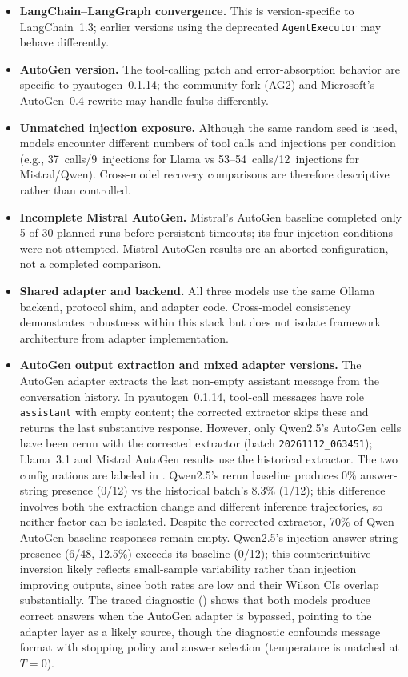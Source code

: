 \documentclass[make,article,submit,moreauthors,pdftex]{mdpi}
\begin{document}
\begin{itemize}
  \item {\textbf{LangChain--LangGraph convergence.} This is version-specific to LangChain~1.3; earlier versions using the deprecated \texttt{AgentExecutor} may behave differently.}
  \item {\textbf{AutoGen version.} The tool-calling patch and error-absorption behavior are specific to pyautogen~0.1.14; the community fork (AG2) and Microsoft's AutoGen~0.4 rewrite may handle faults differently.}
  \item {\textbf{Unmatched injection exposure.} Although the same random seed is used, models encounter different numbers of tool calls and injections per condition (e.g., 37~calls/9~injections for Llama vs 53--54~calls/12~injections for Mistral/Qwen). Cross-model recovery comparisons are therefore descriptive rather than controlled.}
  \item {\textbf{Incomplete Mistral AutoGen.} Mistral's AutoGen baseline completed only 5 of 30 planned runs before persistent timeouts; its four injection conditions were not attempted. Mistral AutoGen results are an aborted configuration, not a completed comparison.}
  \item {\textbf{Shared adapter and backend.} All three models use the same Ollama backend, protocol shim, and adapter code. Cross-model consistency demonstrates robustness within this stack but does not isolate framework architecture from adapter implementation.}
  \item {\textbf{AutoGen output extraction and mixed adapter versions.} The AutoGen adapter extracts the last non-empty assistant message from the conversation history. In pyautogen~0.1.14, tool-call messages have role \texttt{assistant} with empty content; the corrected extractor skips these and returns the last substantive response. However, only Qwen2.5's AutoGen cells have been rerun with the corrected extractor (batch \texttt{20261112\_063451}); Llama~3.1 and Mistral AutoGen results use the historical extractor. The two configurations are labeled in . Qwen2.5's rerun baseline produces 0\% answer-string presence (0/12) vs the historical batch's 8.3\% (1/12); this difference involves both the extraction change and different inference trajectories, so neither factor can be isolated. Despite the corrected extractor, 70\% of Qwen AutoGen baseline responses remain empty. Qwen2.5's injection answer-string presence (6/48, 12.5\%) exceeds its baseline (0/12); this counterintuitive inversion likely reflects small-sample variability rather than injection improving outputs, since both rates are low and their Wilson CIs overlap substantially. The traced diagnostic () shows that both models produce correct answers when the AutoGen adapter is bypassed, pointing to the adapter layer as a likely source, though the diagnostic confounds message format with stopping policy and answer selection (temperature is matched at $T\!=\!0$).}
\end{itemize}
\end{document}
